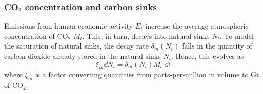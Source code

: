 \documentclass[../../main.tex]{subfiles}
\begin{document}
\subsubsection[Carbon Dioxide concentration]{CO$_2$ concentration and carbon sinks}

Emissions from human economic activity $E_t$ increase the average atmospheric concentration of CO$_2$ $M_t$. This, in turn, decays into natural sinks $N_t$. To model the saturation of natural sinks, the decay rate $\delta_m(N_t)$ falls in the quantity of carbon dioxide already stored in the natural sinks $N_t$. Hence, this evolves as \begin{equation}
    \xi_m \dd{N_t} = \delta_m(N_t) M_t \; \dd{t}
\end{equation} where $\xi_m$ is a factor converting quantities from parts-per-million in volume to \unit{Gt} of CO$_2$.
\end{document}
